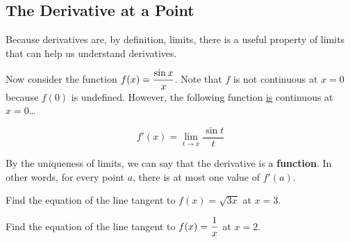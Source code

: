 \documentclass[12pt]{article}
\begin{document}
\newpage

\subsection*{The Derivative at a Point}


\vspace{5mm}

Because derivatives are, by definition, limits, there is a useful property of limits that can help us understand derivatives.

\vspace{3mm}


\vspace{3mm}

Now consider the function $f(x)=\displaystyle\frac{\sin x}{x}$. Note that $f$ is not continuous at $x=0$ because $f(0)$ is undefined. However, the following function \underline{is} continuous at $x=0$\dots

$$f'(x)=\lim_{t\to x}\frac{\sin t}{t}$$

\vspace{2mm}

By the uniqueness of limits, we can say that the derivative is a \textbf{function}. In other words, for every point $a$, there is at most one value of $f'(a)$.

\vspace{5mm}

\Example Find the equation of the line tangent to $f(x)=\sqrt{3x}$ at $x=3$.

\newpage

\Example Find the equation of the line tangent to $f(x)=\displaystyle\frac{1}{x}$ at $x=2$.
\end{document}
